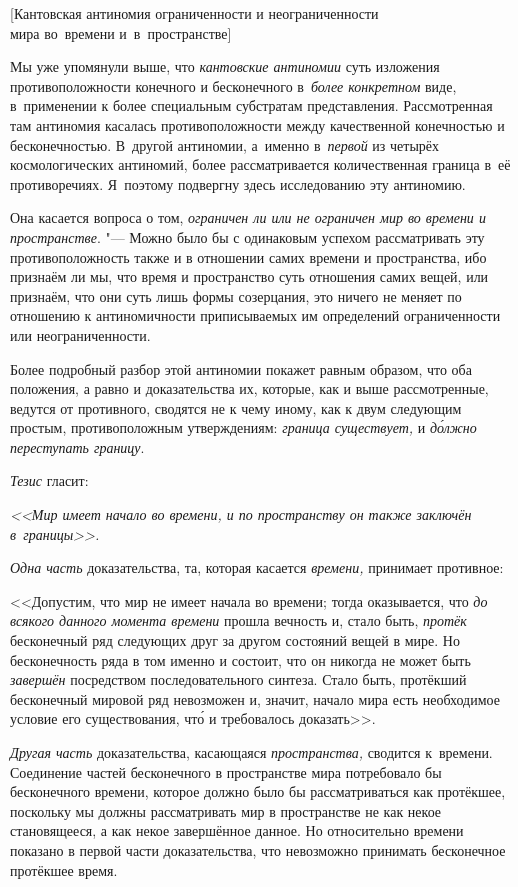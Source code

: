 %
{[Кантовская антиномия ограниченности и неограниченности\nopagebreak\\
мира во~времени и~в~пространстве]}

Мы уже упомянули выше, что {\em кантовские антиномии} суть изложения
противоположности конечного и бесконечного в~{\em более конкретном} виде,
в~применении к более специальным субстратам представления. Рассмотренная там
антиномия касалась противоположности между качественной конечностью и
бесконечностью. В~другой антиномии, а~именно в~{\em первой} из четырёх
космологических антиномий, более рассматривается количественная граница в~её
противоречиях. Я~поэтому подвергну здесь исследованию эту антиномию.

Она касается вопроса о том,
{\em ограничен ли или не ограничен мир во времени и пространстве}. "--- Можно
было бы с одинаковым успехом рассматривать эту противоположность также
и в отношении самих времени и пространства, ибо признаём ли мы, что время
и пространство суть отношения самих вещей, или признаём, что они суть лишь
формы созерцания, это ничего не меняет по отношению к антиномичности
приписываемых им определений ограниченности или неограниченности.

Более подробный разбор этой антиномии покажет равным образом, что оба
положения, а равно и доказательства их, которые, как и выше рассмотренные,
ведутся от противного, сводятся не к чему иному, как к двум следующим простым,
противоположным утверждениям: {\em граница существует,} и
{\em д\'{о}лжно переступать границу}.

{\em Тезис} гласит:

{\em <<Мир имеет начало во времени, и по пространству он
также заключён в~границы>>.}

{\em Одна часть} доказательства, та, которая касается
{\em времени,} принимает противное:

<<Допустим, что мир не имеет начала во времени; тогда оказывается, что
{\em до всякого данного момента времени} прошла вечность и, стало быть,
{\em протёк} бесконечный ряд следующих друг за другом состояний вещей в мире.
Но бесконечность ряда в том именно и состоит, что он никогда не может быть
{\em завершён} посредством последовательного синтеза. Стало быть, протёкший
бесконечный мировой ряд невозможен и, значит, начало мира есть необходимое
условие его существования, чт\'{о} и требовалось доказать>>.

{\em Другая часть} доказательства, касающаяся {\em пространства,} сводится
к~времени. Соединение частей бесконечного в пространстве мира потребовало бы
бесконечного времени, которое должно было бы рассматриваться как протёкшее,
поскольку мы должны рассматривать мир в пространстве не как некое становящееся,
а как некое завершённое данное. Но относительно времени показано в первой части
доказательства, что невозможно принимать бесконечное протёкшее время.

